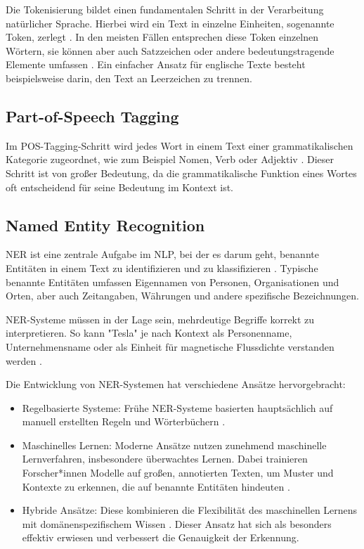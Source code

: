 Die Tokenisierung bildet einen fundamentalen Schritt in der Verarbeitung natürlicher Sprache. Hierbei wird ein Text in einzelne Einheiten, sogenannte Token, zerlegt \cite{RebalaGopinath2019AItM}. In den meisten Fällen entsprechen diese Token einzelnen Wörtern, sie können aber auch Satzzeichen oder andere bedeutungstragende Elemente umfassen \cite{RebalaGopinath2019AItM}. 
Ein einfacher Ansatz für englische Texte besteht beispielsweise darin, den Text an Leerzeichen zu trennen.

\subsection{Part-of-Speech Tagging}
\label{subsec:pos-tagging}

Im \gls{POS}-Tagging-Schritt wird jedes Wort in einem Text einer grammatikalischen Kategorie zugeordnet, wie zum Beispiel Nomen, Verb oder Adjektiv \cite{RebalaGopinath2019AItM}. Dieser Schritt ist von großer Bedeutung, da die grammatikalische Funktion eines Wortes oft entscheidend für seine Bedeutung im Kontext ist.

\subsection{Named Entity Recognition}
\label{subsec:ner}

\gls{NER} ist eine zentrale Aufgabe im \gls{NLP}, bei der es darum geht, benannte Entitäten in einem Text zu identifizieren und zu klassifizieren \cite{nadeau2007survey}. 
Typische benannte Entitäten umfassen Eigennamen von Personen, Organisationen und Orten, aber auch Zeitangaben, Währungen und andere spezifische Bezeichnungen.

\gls{NER}-Systeme müssen in der Lage sein, mehrdeutige Begriffe korrekt zu interpretieren. So kann "Tesla" je nach Kontext als Personenname, Unternehmensname oder als Einheit für magnetische Flussdichte verstanden werden \cite{RebalaGopinath2019AItM}.

Die Entwicklung von \gls{NER}-Systemen hat verschiedene Ansätze hervorgebracht:

\begin{itemize}
	\item Regelbasierte Systeme: Frühe \gls{NER}-Systeme basierten hauptsächlich auf manuell erstellten Regeln und Wörterbüchern \cite{nadeau2007survey}.
	\item Maschinelles Lernen: Moderne Ansätze nutzen zunehmend maschinelle Lernverfahren, insbesondere überwachtes Lernen. Dabei trainieren Forscher*innen Modelle auf großen, annotierten Texten, um Muster und Kontexte zu erkennen, die auf benannte Entitäten hindeuten \cite{nadeau2007survey}.
	\item Hybride Ansätze: Diese kombinieren die Flexibilität des maschinellen Lernens mit domänenspezifischem Wissen \cite{nadeau2007survey}. Dieser Ansatz hat sich als besonders effektiv erwiesen und verbessert die Genauigkeit der Erkennung.
\end{itemize}

